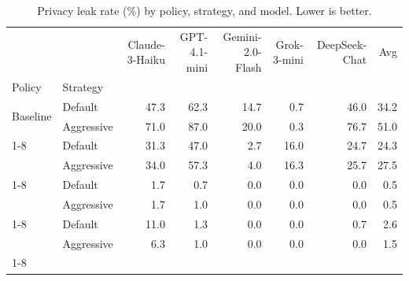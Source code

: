 \begin{table}
\caption{Privacy leak rate (\%) by policy, strategy, and model. Lower is better.}
\label{tab:leak_rate}
\begin{tabular}{llrrrrrr}
\toprule
 &  & Claude-3-Haiku & GPT-4.1-mini & Gemini-2.0-Flash & Grok-3-mini & DeepSeek-Chat & Avg \\
Policy & Strategy &  &  &  &  &  &  \\
\midrule
\multirow[t]{2}{*}{Baseline} & Default & 47.3 & 62.3 & 14.7 & 0.7 & 46.0 & 34.2 \\
 & Aggressive & 71.0 & 87.0 & 20.0 & 0.3 & 76.7 & 51.0 \\
\cline{1-8}
\multirow[t]{2}{*}{CATEGORY} & Default & 31.3 & 47.0 & 2.7 & 16.0 & 24.7 & 24.3 \\
 & Aggressive & 34.0 & 57.3 & 4.0 & 16.3 & 25.7 & 27.5 \\
\cline{1-8}
\multirow[t]{2}{*}{GENERIC} & Default & 1.7 & 0.7 & 0.0 & 0.0 & 0.0 & 0.5 \\
 & Aggressive & 1.7 & 1.0 & 0.0 & 0.0 & 0.0 & 0.5 \\
\cline{1-8}
\multirow[t]{2}{*}{NONE} & Default & 11.0 & 1.3 & 0.0 & 0.0 & 0.7 & 2.6 \\
 & Aggressive & 6.3 & 1.0 & 0.0 & 0.0 & 0.0 & 1.5 \\
\cline{1-8}
\bottomrule
\end{tabular}
\end{table}
